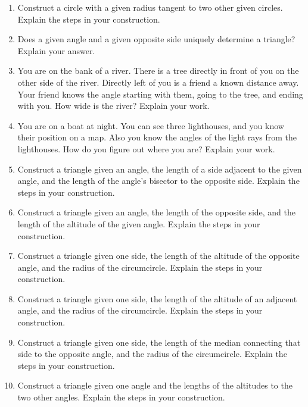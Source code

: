 \begin{enumerate}
\item Construct a circle with a given radius tangent to two other
  given circles. Explain the steps in your construction.

\item Does a given angle and a given opposite side uniquely determine
  a triangle? Explain your answer.

\item You are on the bank of a river. There is a tree directly in
  front of you on the other side of the river. Directly left of you is
  a friend a known distance away. Your friend knows the angle starting
  with them, going to the tree, and ending with you. How wide is the
  river? Explain your work.

\item You are on a boat at night. You can see three lighthouses, and
  you know their position on a map.  Also you know the angles of the
  light rays from the lighthouses.  How do you figure out where you
  are? Explain your work.

\item Construct a triangle given an angle, the length of a side
  adjacent to the given angle, and the length of the angle's bisector
  to the opposite side. Explain the steps in your construction.

\item Construct a triangle given an angle, the length of the opposite
  side, and the length of the altitude of the given angle. Explain the
  steps in your construction.

\item Construct a triangle given one side, the length of the altitude
  of the opposite angle, and the radius of the circumcircle. Explain
  the steps in your construction.

\item Construct a triangle given one side, the length of the altitude
  of an adjacent angle, and the radius of the circumcircle. Explain
  the steps in your construction.

\item Construct a triangle given one side, the length of the median
  connecting that side to the opposite angle, and the radius of the
  circumcircle. Explain the steps in your construction.  

\item Construct a triangle given one angle and the lengths of the
  altitudes to the two other angles. Explain the steps in your
  construction.


\end{enumerate}
